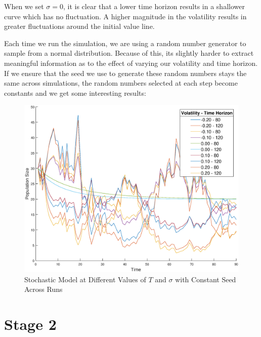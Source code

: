 \documentclass[]{article}
\begin{document}
	When we set $\sigma = 0$, it is clear that a lower time horizon results in a shallower curve which has no fluctuation. A higher magnitude in the volatility results in greater fluctuations around the initial value line.
	
	Each time we run the simulation, we are using a random number generator to sample from a normal distribution. Because of this, its slightly harder to extract meaningful information as to the effect of varying our volatility and time horizon. If we ensure that the seed we use to generate these random numbers stays the same across simulations, the random numbers selected at each step become constants and we get some interesting results:
	
	\begin{figure}[h!]
		\centering
		\includegraphics[scale=0.35]{images/stochastic_model_const.eps}
		\caption{Stochastic Model at Different Values of $T$ and $\sigma$ with Constant Seed Across Runs}
	\end{figure}
	
	\section{Stage 2}
\end{document}

